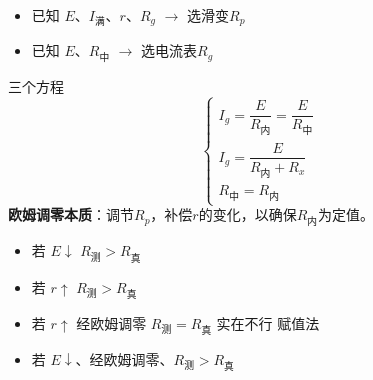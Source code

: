 \begin{itemize}
\item 已知 $E$、$I_{\text{满}}$、$r$、$R_g$ $\to$ 选滑变$R_p$
\item 已知 $E$、$R_{\text{中}}$ $\to$ 选电流表$R_g$
\end{itemize}

三个方程
\[
\begin{cases}
I_g=\dfrac{E}{R_{\text{内}}}=\dfrac{E}{R_{\text{中}}}\\[1.2ex]
I_g=\dfrac{E}{R_{\text{内}}+R_x}\\[1.2ex]
R_{\text{中}}=R_{\text{内}}
\end{cases}
\]
\textbf{欧姆调零本质}：调节$R_p$，补偿$r$的变化，以确保$R_{\text{内}}$为定值。

\begin{itemize}
\item 若 $E\downarrow$ \qquad\qquad $R_{\text{测}}>R_{\text{真}}$
\item 若 $r\uparrow$ \qquad\qquad $R_{\text{测}}>R_{\text{真}}$
\item 若 $r\uparrow$ 经欧姆调零 $R_{\text{测}}=R_{\text{真}}$ \qquad 实在不行 赋值法
\item 若 $E\downarrow$、经欧姆调零、$R_{\text{测}}>R_{\text{真}}$
\end{itemize}

